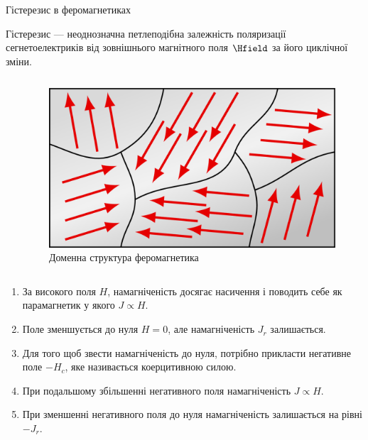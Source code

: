 \documentclass[onlytextwidth]{beamer}
\begin{document}
\begin{frame}{Гістерезис в феромагнетиках}{}\small
	\begin{block}{}\justifying
		\alert{Гістерезис} --- неоднозначна петлеподібна залежність поляризації сегнетоелектриків від
		зовнішнього магнітного поля $\Hfield$ за його циклічної зміни.
	\end{block}
	\begin{columns}
		\begin{column}{0.5\linewidth}\centering
            
		\end{column}
		\begin{column}{0.5\linewidth}
			\begin{figure}
				\includegraphics[width=0.5\linewidth]{domains}
				\caption{\centering\scriptsize Доменна структура феромагнетика}
			\end{figure}
		\end{column}
	\end{columns}
	\begin{enumerate}\justifying\scriptsize
		\item За високого поля $ H $, намагніченість досягає насичення і поводить себе як
		      парамагнетик у якого $J \propto H$.
		\item  Поле зменшується до нуля $H = 0$, але намагніченість $ J_r $ залишається.
		\item Для того щоб звести намагніченість до нуля, потрібно прикласти негативне поле $-H_c$,
		      яке називається \alert{коерцитивною силою}.
		\item При подальшому збільшенні негативного поля намагніченість $J \propto H$.
		\item  При зменшенні негативного поля до нуля намагніченість залишається на рівні $ -J_r $.
	\end{enumerate}
\end{frame}
\end{document}
